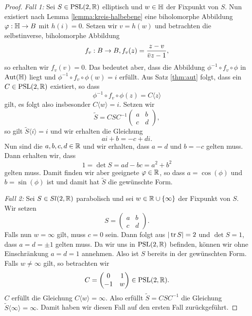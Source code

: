 \begin{proof}
  \emph{Fall 1:} Sei $S \in \operatorname{PSL}(2, \mathbb{R})$ elliptisch und $w \in \mathbb{H}$ der
  Fixpunkt von $S$. Nun existiert nach Lemma \ref{lemma:kreis-halbebene}
  eine biholomorphe Abbildung $\varphi: \mathbb{H} \rightarrow B$ mit $h(i) = 0$. Setzen
  wir $v = h(w)$ und betrachten die selbstinverse, biholomorphe
  Abbildung
  \[
  f_v : B \rightarrow B, f_v(z) = \frac{z-v}{\bar v z - 1},
  \]
  so erhalten wir $f_v(v) = 0$. Das bedeutet aber, dass die Abbildung
  $\phi^{-1} \circ f_v \circ \phi$ in $\operatorname{Aut}(\mathbb{H})$ liegt und $\phi^{-1}
  \circ f_v \circ \phi (w) = i$ erfüllt. Aus Satz \ref{thm:aut} folgt,
  dass ein $C \in \operatorname{PSL}(2, \mathbb{R})$ existiert, so dass
  \[
  \phi^{-1} \circ f_v \circ \phi(z) = C \langle z \rangle
  \]
  gilt, es folgt also insbesonder $C\langle w \rangle = i$. Setzen wir
  \[
  \tilde S = CSC^{-1}
  \begin{pmatrix}
    a & b\\
    c & d
  \end{pmatrix},
  \]
  so gilt $\tilde S\langle i \rangle = i$ und wir erhalten die
  Gleichung
  \[
  ai +b = -c + di.
  \]
  Nun sind die $a,b,c,d \in \mathbb{R}$ und wir erhalten, dass $a = d$ und $b
  = - c$ gelten muss. Dann erhalten wir, dass
  \[
  1 = \det S = ad - bc = a^2 + b^2
  \]
  gelten muss. Damit finden wir aber geeignete $\varphi \in \mathbb{R}$, so dass
  $a = \cos(\phi)$ und $b = \sin(\phi)$ ist und damit hat $\tilde
  S$ die gewünschte Form.

  \emph{Fall 2:} Sei $S \in Sl(2, \mathbb{R})$ parabolisch und sei $w \in \mathbb{R}
  \cup \{\infty\}$ der Fixpunkt von $S$. Wir setzen
  \[
  S =
  \begin{pmatrix}
    a & b\\
    c & d
  \end{pmatrix}.
  \]
  Falls nun $w = \infty$ gilt, muss $c =0$ sein. Dann folgt aus
  $|\operatorname{tr} S| = 2$ und $\det S = 1$, dass $a = d = \pm 1$ gelten
  muss. Da wir uns in $\operatorname{PSL}(2,\mathbb{R})$ befinden, können wir ohne
  Einschränkung $a = d = 1$ annehmen. Also ist $S$ bereits in der
  gewünschten Form. Falls $w \neq \infty$ gilt, so betrachten wir
  \[
  C =
  \begin{pmatrix}
    0 & 1 \\
    -1 & w
  \end{pmatrix}
  \in \operatorname{PSL}(2,\mathbb{R}).
  \]
  $C$ erfüllt die Gleichung $C \langle w \rangle  = \infty$. Also
  erfüllt $\tilde S = C S C^{-1}$ die Gleichung $\tilde S\langle \infty
  \rangle = \infty$. Damit haben wir diesen Fall auf den ersten Fall
  zurückgeführt.
  

\end{proof}
